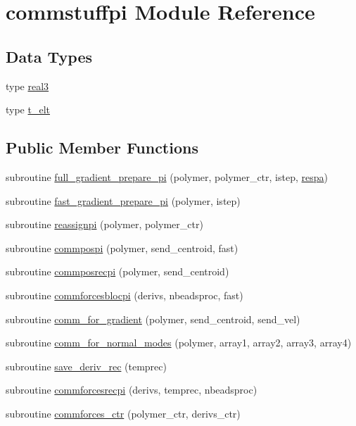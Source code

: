 \hypertarget{classcommstuffpi}{\section{commstuffpi Module Reference}
\label{classcommstuffpi}
}
\subsection*{Data Types}
\begin{DoxyCompactItemize}
\item 
type \hyperlink{structcommstuffpi_1_1real3}{real3}
\item 
type \hyperlink{structcommstuffpi_1_1t__elt}{t\-\_\-elt}
\end{DoxyCompactItemize}
\subsection*{Public Member Functions}
\begin{DoxyCompactItemize}
\item 
subroutine \hyperlink{classcommstuffpi_a16cff35454e936d788925c3546e2ebb6}{full\-\_\-gradient\-\_\-prepare\-\_\-pi} (polymer, polymer\-\_\-ctr, istep, \hyperlink{respa_8f90_a9973bf6f030df2aeeef2a2c0fd9079dc}{respa})
\item 
subroutine \hyperlink{classcommstuffpi_ab9176f8de5cba7fc13e7f47335672e62}{fast\-\_\-gradient\-\_\-prepare\-\_\-pi} (polymer, istep)
\item 
subroutine \hyperlink{classcommstuffpi_acf6a40330e2ee2ef22abaf26800da5a9}{reassignpi} (polymer, polymer\-\_\-ctr)
\item 
subroutine \hyperlink{classcommstuffpi_acff2de85dc043120a83b35206ccdd941}{commpospi} (polymer, send\-\_\-centroid, fast)
\item 
subroutine \hyperlink{classcommstuffpi_a00bc8e52d9c14e0398976a17a43cac45}{commposrecpi} (polymer, send\-\_\-centroid)
\item 
subroutine \hyperlink{classcommstuffpi_aafc86594dc2de9b20ac0bcbbb043ec8a}{commforcesblocpi} (derivs, nbeadsproc, fast)
\item 
subroutine \hyperlink{classcommstuffpi_afc06456e4b65d919d669fae9c4623729}{comm\-\_\-for\-\_\-gradient} (polymer, send\-\_\-centroid, send\-\_\-vel)
\item 
subroutine \hyperlink{classcommstuffpi_a8e8bbcfecee03d3d2a98821bbc61b58f}{comm\-\_\-for\-\_\-normal\-\_\-modes} (polymer, array1, array2, array3, array4)
\item 
subroutine \hyperlink{classcommstuffpi_aac04141710087d41025d561ce29c7b4b}{save\-\_\-deriv\-\_\-rec} (temprec)
\item 
subroutine \hyperlink{classcommstuffpi_a5e1481d2895cd682bddb3e2b8e232ef5}{commforcesrecpi} (derivs, temprec, nbeadsproc)
\item 
subroutine \hyperlink{classcommstuffpi_a526ebb0cb7646b9a009968b8e3060fe5}{commforces\-\_\-ctr} (polymer\-\_\-ctr, derivs\-\_\-ctr)
\end{DoxyCompactItemize}
